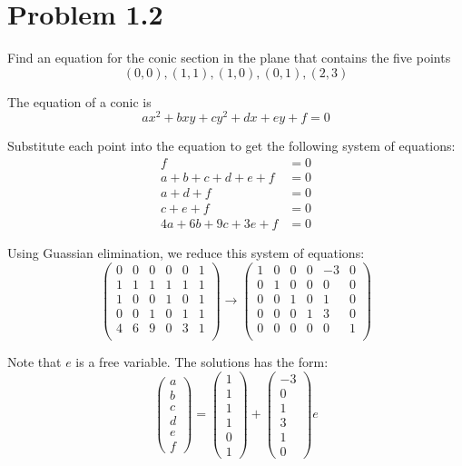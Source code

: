 \section*{Problem 1.2}

Find an equation for the conic section in the plane that contains the five
points 
\[ (0, 0), (1, 1), (1, 0), (0, 1), (2, 3) \]

The equation of a conic is 
\[ ax^2 + bxy + cy^2 + dx + ey + f = 0 \]

Substitute each point into the equation to get the following system of
equations:
\begin{align*}
  f &= 0 \\
  a + b + c + d + e + f &= 0 \\
  a + d + f &= 0 \\
  c + e + f &= 0 \\
  4a + 6b + 9c + 3e + f &= 0
\end{align*}

Using Guassian elimination, we reduce this system of equations:
\[
  \begin{pmatrix}
    0 & 0 & 0 & 0 & 0 & 1 \\
    1 & 1 & 1 & 1 & 1 & 1 \\
    1 & 0 & 0 & 1 & 0 & 1 \\
    0 & 0 & 1 & 0 & 1 & 1 \\
    4 & 6 & 9 & 0 & 3 & 1 \\
  \end{pmatrix}
  \rightarrow
  \begin{pmatrix}
    1 & 0 & 0 & 0 & -3 & 0 \\
    0 & 1 & 0 & 0 & 0 & 0 \\
    0 & 0 & 1 & 0 & 1 & 0 \\
    0 & 0 & 0 & 1 & 3 & 0 \\
    0 & 0 & 0 & 0 & 0 & 1 \\ 
  \end{pmatrix}
\]

Note that $e$ is a free variable. The solutions has the form:
\[
 \begin{pmatrix} a \\ b \\ c \\ d \\ e \\ f \end{pmatrix} 
 =
 \begin{pmatrix} 1 \\ 1 \\ 1 \\ 1 \\ 0 \\ 1 \end{pmatrix}
 +
 \begin{pmatrix} -3 \\ 0 \\ 1 \\ 3 \\ 1 \\ 0 \end{pmatrix}e
\]

